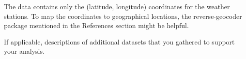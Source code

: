 The data contains only the (latitude, longitude) coordinates for the weather stations. To map the coordinates to geographical locations, the reverse-geocoder package mentioned in the References section might be helpful.

If applicable, descriptions of additional datasets that you gathered to support your analysis.